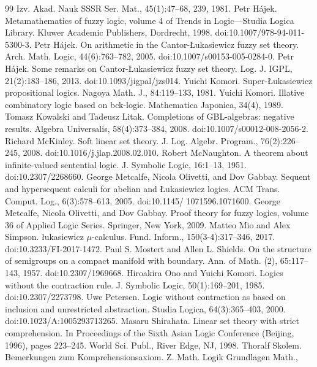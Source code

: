 \documentclass[10pt,a4paper]{article}
\begin{document}
\begin{thebibliography}{99}
Izv. Akad. Nauk SSSR Ser. Mat., 45(1):47–68, 239, 1981.
 Petr Hájek. Metamathematics of fuzzy logic, volume 4 of Trends in Logic—Studia Logica
Library. Kluwer Academic Publishers, Dordrecht, 1998. doi:10.1007/978-94-011-5300-3.
 Petr Hájek. On arithmetic in the Cantor-Łukasiewicz fuzzy set theory. Arch. Math. Logic,
44(6):763–782, 2005. doi:10.1007/s00153-005-0284-0.
 Petr Hájek. Some remarks on Cantor-Łukasiewicz fuzzy set theory. Log. J. IGPL, 21(2):183–186,
2013. doi:10.1093/jigpal/jzs014.
 Yuichi Komori. Super-Łukasiewicz propositional logics. Nagoya Math. J., 84:119–133, 1981.
 Yuichi Komori. Illative combinatory logic based on bck-logic. Mathematica Japonica, 34(4),
1989.
 Tomasz Kowalski and Tadeusz Litak. Completions of GBL-algebras: negative results. Algebra
Universalis, 58(4):373–384, 2008. doi:10.1007/s00012-008-2056-2.
 Richard McKinley. Soft linear set theory. J. Log. Algebr. Program., 76(2):226–245, 2008.
doi:10.1016/j.jlap.2008.02.010.
 Robert McNaughton. A theorem about infinite-valued sentential logic. J. Symbolic Logic,
16:1–13, 1951. doi:10.2307/2268660.
 George Metcalfe, Nicola Olivetti, and Dov Gabbay. Sequent and hypersequent calculi for
abelian and Łukasiewicz logics. ACM Trans. Comput. Log., 6(3):578–613, 2005. doi:10.1145/
1071596.1071600.
 George Metcalfe, Nicola Olivetti, and Dov Gabbay. Proof theory for fuzzy logics, volume 36 of
Applied Logic Series. Springer, New York, 2009.
 Matteo Mio and Alex Simpson. łukasiewicz \ensuremath{\mu}-calculus. Fund. Inform., 150(3-4):317–346, 2017.
doi:10.3233/FI-2017-1472.
 Paul S. Mostert and Allen L. Shields. On the structure of semigroups on a compact manifold
with boundary. Ann. of Math. (2), 65:117–143, 1957. doi:10.2307/1969668.
 Hiroakira Ono and Yuichi Komori. Logics without the contraction rule. J. Symbolic Logic,
50(1):169–201, 1985. doi:10.2307/2273798.
 Uwe Petersen. Logic without contraction as based on inclusion and unrestricted abstraction.
Studia Logica, 64(3):365–403, 2000. doi:10.1023/A:1005293713265.
 Masaru Shirahata. Linear set theory with strict comprehension. In Proceedings of the Sixth
Asian Logic Conference (Beijing, 1996), pages 223–245. World Sci. Publ., River Edge, NJ,
1998.
 Thoralf Skolem. Bemerkungen zum Komprehensionsaxiom. Z. Math. Logik Grundlagen Math.,

\end{thebibliography}
\end{document}

